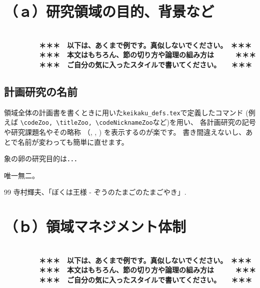 \documentclass[11pt,a4j,dvipdfmx]{jarticle} 					%
\newcommand{\研究課題名}{象の卵}
\newcommand{\研究機関名}{逢坂大学}
\newcommand{\研究代表者氏名}{湯川秀樹}
\newcommand{\研究期間の最終元号年度}{9}  %
\begin{document}

\section{（ａ）研究領域の目的、背景など}

\JSPSInstructions		%
\textbf{\\　　　　　＊＊＊　以下は、あくまで例です。真似しないでください。　＊＊＊\\
　　　　　＊＊＊　本文はもちろん、節の切り方や論理の組み方は　　　＊＊＊\\
　　　　　＊＊＊　ご自分の気に入ったスタイルで書いてください。　　＊＊＊}

\subsection{計画研究の名前}
        領域全体の計画書を書くときに用いた\texttt{keikaku\_defs.tex}で定義したコマンド
        (例えば
        \texttt{\textbackslash codeZoo, \textbackslash titleZoo, \textbackslash codeNicknameZoo}など)を用い、
        各計画研究の記号や研究課題名やその略称
        （\codeZoo, \titleZoo, \codeNicknameZoo)
        を表示するのが楽です。
       書き間違えないし、あとで名前が変わっても簡単に直せます。

	 象の卵の研究目的は．．．

	唯一無二。




	\vspace{1cm}
	\begin{thebibliography}{99}
		 寺村輝夫、「ぼくは王様 - ぞうのたまごのたまごやき」.
	\end{thebibliography}




\section{（ｂ）領域マネジメント体制}

\textbf{\\　　　　　＊＊＊　以下は、あくまで例です。真似しないでください。　＊＊＊\\
　　　　　＊＊＊　本文はもちろん、節の切り方や論理の組み方は　　　＊＊＊\\
　　　　　＊＊＊　ご自分の気に入ったスタイルで書いてください。　　＊＊＊}
\end{document}
